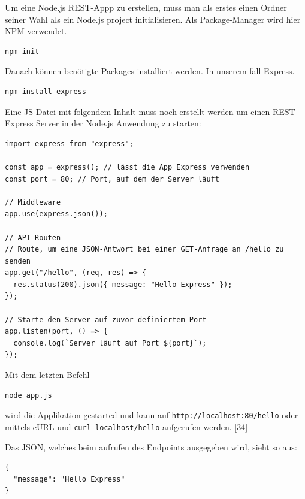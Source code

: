 \documentclass[
    headings=optiontotocandhead,%
    twoside,
    numbers=noenddot,%
    12pt, %
    titlepage, %
    parskip=full, %
    listof=leveldown, 
    numbers=noenddot, %
    a4paper,DIV=14,
    BCOR=15mm,
]{scrbook}
\newcommand{\passthrough}[1]{#1}
\begin{document}
Um eine Node.js REST-Appp zu erstellen, muss man als erstes einen Ordner
seiner Wahl als ein Node.js project initialisieren. Als Package-Manager
wird hier NPM verwendet.

\begin{lstlisting}[caption={Initialisieren eines Node.js Projekts}]
  npm init
\end{lstlisting}

Danach können benötigte Packages installiert werden. In unserem fall
Express.

\begin{lstlisting}[caption={Installieren vom Express package}]
npm install express
\end{lstlisting}

Eine JS Datei mit folgendem Inhalt muss noch erstellt werden um einen
REST-Express Server in der Node.js Anwendung zu starten:

\begin{lstlisting}[caption={Beispiel für eine REST Schnitstelle in Node.js}]
import express from "express";

const app = express(); // lässt die App Express verwenden
const port = 80; // Port, auf dem der Server läuft

// Middleware
app.use(express.json());

// API-Routen
// Route, um eine JSON-Antwort bei einer GET-Anfrage an /hello zu senden
app.get("/hello", (req, res) => {
  res.status(200).json({ message: "Hello Express" });
});

// Starte den Server auf zuvor definiertem Port
app.listen(port, () => {
  console.log(`Server läuft auf Port ${port}`);
});
\end{lstlisting}

Mit dem letzten Befehl

\begin{lstlisting}[caption={Starten einer Node.js Applikation}]
node app.js
\end{lstlisting}

wird die Applikation gestarted und kann auf
\passthrough{\lstinline!http://localhost:80/hello!} oder mittels cURL
und \passthrough{\lstinline!curl localhost/hello!} aufgerufen werden.
{[}\protect\hyperlink{ref-medium-rest-node-js}{34}{]}

Das JSON, welches beim aufrufen des Endpoints ausgegeben wird, sieht so
aus:

\begin{lstlisting}[caption={Ausgabe eines Beispiel-REST-Endpoints}]
{
  "message": "Hello Express"
}
\end{lstlisting}
\end{document}
